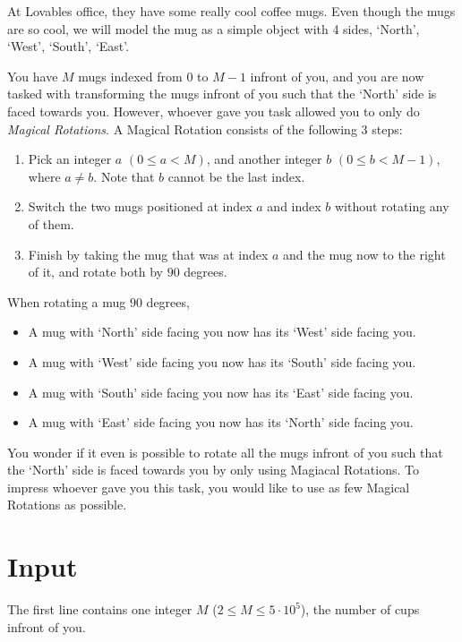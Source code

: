 

At Lovables office, they have some really cool coffee mugs. 
Even though the mugs are so cool, we will model the mug as a simple object with 4 sides, `North', `West', `South', `East'.

You have $M$ mugs indexed from $0$ to $M-1$ infront of you, and you are now tasked with transforming the mugs infront of you such that the `North' side is faced towards you.
However, whoever gave you task allowed you to only do \textit{Magical Rotations}. A Magical Rotation consists of the following 3 steps:
\begin{enumerate}
  \item Pick an integer $a$ $(0 \leq a < M)$, and another integer $b$ $(0 \leq b < M-1)$, where $a \neq b$. Note that $b$ cannot be the last index. 
  \item Switch the two mugs positioned at index $a$ and index $b$ without rotating any of them.
  \item Finish by taking the mug that was at index $a$ and the mug now to the right of it, and rotate both by $90$ degrees.
\end{enumerate}

When rotating a mug $90$ degrees, 
\begin{itemize}
  \item A mug with `North' side facing you now has its `West' side facing you.
  \item A mug with `West' side facing you now has its `South' side facing you.  
  \item A mug with `South' side facing you now has its `East' side facing you.  
  \item A mug with `East' side facing you now has its `North' side facing you.  
\end{itemize}

You wonder if it even is possible to rotate all the mugs infront of you such that the `North' side is faced towards you by only using Magiacal Rotations.
To impress whoever gave you this task, you would like to use as few Magical Rotations as possible.

\section*{Input}
The first line contains one integer $M$ ($2 \leq M \leq 5 \cdot 10^5$), the number of cups infront of you.

